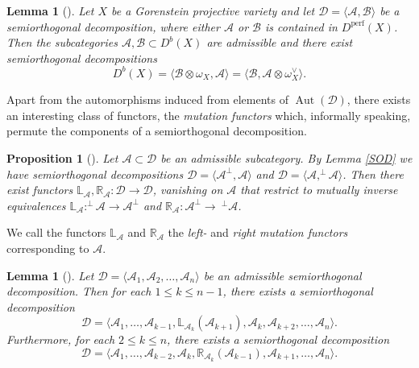 \documentclass[a4paper, twoside, 11pt]{amsart}
\newtheorem{lemma}[theorem]{Lemma}
\newtheorem{proposition}[theorem]{Proposition}
\theoremstyle{definition}
\theoremstyle{remark}
\numberwithin{equation}{theorem}
\DeclareMathOperator{\lilperf}{perf}
\DeclareMathOperator{\aut}{Aut}
\newcommand{\dbx}{D^b(X)}
\begin{document}
\begin{lemma}[{\cite[Lemma 2.15]{Kalck_Shinder_Pavic}}]\label{SOD_and_Serre}
	Let $X$ be a Gorenstein projective variety and let $\mathcal{D} = \langle \mathcal{A}, \mathcal{B} \rangle$ be a semiorthogonal decomposition, where either $\mathcal{A}$ or $\mathcal{B}$ is contained in $D^{\lilperf}(X)$. Then the subcategories $\mathcal{A}, \mathcal{B} \subset \dbx$ are admissible and there exist semiorthogonal decompositions 
	\begin{equation*}
		\dbx = \langle \mathcal{B}\otimes \omega_{X}, \mathcal{A} \rangle = \langle \mathcal{B}, \mathcal{A} \otimes \omega_X^\vee \rangle.
	\end{equation*}
\end{lemma}
Apart from the automorphisms induced from elements of $\aut(\mathcal{D})$, there exists an interesting class of functors, the \textit{mutation functors} which, informally speaking, permute the components of a semiorthogonal decomposition. 
\begin{proposition}[{\cite{Bondal_ass_alg_coh}}]
	Let $\mathcal{A} \subset \mathcal{D}$ be an admissible subcategory. By Lemma \ref{SOD} we have semiorthogonal decompositions $\mathcal{D} =\langle \mathcal{A}^\bot, \mathcal{A}\rangle$ and $\mathcal{D} =\langle \mathcal{A}, ^\bot\mathcal{A}\rangle$. Then there exist functors $\mathbb{L}_{\mathcal{A}}, \mathbb{R}_{\mathcal{A}}\colon \mathcal{D} \to \mathcal{D}$, vanishing on $\mathcal{A}$ that restrict to mutually inverse equivalences $\mathbb{L}_{\mathcal{A}}\colon^\bot\mathcal{A} \to \mathcal{A}^\bot$ and $\mathbb{R}_{\mathcal{A}}\colon\mathcal{A}^\bot \to \ ^\bot\mathcal{A}$.
\end{proposition}
	We call the functors $\mathbb{L}_{\mathcal{A}}$ and $\mathbb{R}_\mathcal{A}$ the \textit{left-} and \textit{right mutation functors} corresponding to $\mathcal{A}$. 
\begin{lemma}[{\cite{Bondal_ass_alg_coh}}]
	Let $\mathcal{D} = \langle \mathcal{A}_1, \mathcal{A}_2, \dots, \mathcal{A}_n\rangle$ be an admissible semiorthogonal decomposition. Then for each $1\leq k \leq n-1$, there exists a semiorthogonal decomposition
	\begin{equation*}
		\mathcal{D} = \langle \mathcal{A}_1, \dots,  \mathcal{A}_{k-1}, \mathbb{L}_{\mathcal{A}_k}(\mathcal{A}_{k+1}), \mathcal{A}_k, \mathcal{A}_{k+2}, \dots,\mathcal{A}_n\rangle.
	\end{equation*}
	Furthermore, for each $2 \leq k \leq n$, there exists a semiorthogonal decomposition 
	\begin{equation*}
		\mathcal{D} = \langle \mathcal{A}_1, \dots, \mathcal{A}_{k-2}, \mathcal{A}_k, \mathbb{R}_{\mathcal{A}_k}(\mathcal{A}_{k-1}), \mathcal{A}_{k+1}, \dots , \mathcal{A}_n\rangle.
	\end{equation*}
\end{lemma}
\end{document}
